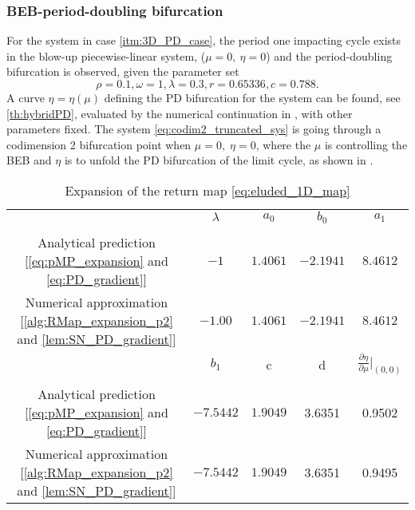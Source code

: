 \subsubsection{BEB-period-doubling bifurcation}\label{subsec:beb-collides-with-pd}
For the system in case \ref{itm:3D_PD_case}, the period one impacting cycle exists in the blow-up piecewise-linear
system,
($\mu =0, ~\eta =0$) and the period-doubling bifurcation is observed, given the parameter set
$$
\rho = 0.1, \omega = 1, \lambda = 0.3, r = 0.65336, c = 0.788.
$$
A curve $\eta = \eta(\mu)$ defining the PD bifurcation for the system can be found, see \cref{th:hybridPD},
evaluated by the numerical continuation in , with other parameters fixed.
The system \cref{eq:codim2_truncated_sys} is going through a codimension 2 bifurcation point when $\mu =
0, \; \eta = 0$, where the $\mu$ is controlling the BEB and $\eta$ is to unfold the PD bifurcation of the
limit cycle, as shown in .
%
\begin{table}[ht!]
	\caption{Expansion of the return map \cref{eq:eluded_1D_map}} %
	\label{tab:RMap_expansion_PD}
	\centering %
	\begin{tabular}{c c c c c }
		\hline\hline
		& $\lambda$ & $a_0$    & $b_0$     & $a_1$                                         \\
		\vspace{-1em}
		\\
		\hline
		Analytical prediction [\eqref{eq:pMP_expansion} and \eqref{eq:PD_gradient}] & $-1$   & $1.4061$ & $-2
		.1941$ &
		$8.4612$                                      \\
		Numerical approximation [\cref{alg:RMap_expansion_p2} and \cref{lem:SN_PD_gradient}]
		& $-1.00$     & $1.4061$        & $-2.1941$         & $8.4612$ \\
		\hline
		& $b_1$ & c & d & $\frac{\partial \eta}{\partial \mu}|_{(0,0)}$\\
		\vspace{-1em}
		\\
		\hline
		Analytical prediction [\eqref{eq:pMP_expansion} and \eqref{eq:PD_gradient}] & $-7.5442$ & $1.9049$ & 3.6351
		& 0.9502 \\
		Numerical approximation [\cref{alg:RMap_expansion_p2} and \cref{lem:SN_PD_gradient}] & $-7.5442$ & $1
		.9049$ & 3.6351 & 0.9495 \\
		\hline
	\end{tabular}
\end{table}


